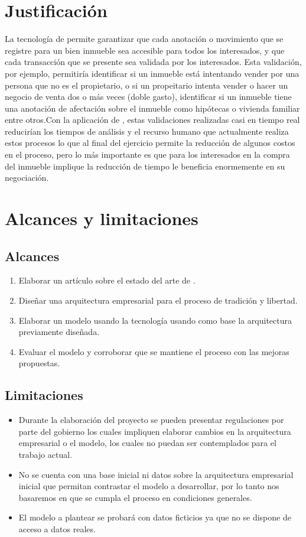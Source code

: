 \section{Justificación}

 La tecnología de \blckchn permite garantizar que cada anotación o movimiento que se registre para un bien inmueble sea accesible para todos los interesados, y que cada transacción que se presente sea validada por los interesados. Esta validación, por ejemplo, permitiría identificar si un inmueble está intentando vender por una persona que no es el propietario, o si un propeitario intenta vender o hacer un negocio de venta dos o más veces (doble gasto), identificar si un inmueble tiene una anotación de afectación sobre el inmueble como hipótecas o vivienda familiar entre otros.Con la aplicación de \blckchn, estas validaciones realizadas casi en tiempo real reducirían los tiempos de análisis y el recurso humano que actualmente realiza estos procesos lo que al final del ejercicio permite la reducción de algunos costos en el proceso, pero lo más importante es que para los interesados en la compra del inmueble implique la reducción de tiempo le beneficia enormemente en su negociación.

\section{Alcances y limitaciones}

\subsection{Alcances}
\begin{enumerate}
\item Elaborar un artículo sobre el estado del arte de \blckchn.
\item Diseñar una arquitectura empresarial para el proceso de tradición y libertad.
\item Elaborar un modelo usando la tecnología \blckchn usando como base la arquitectura previamente diseñada.
\item Evaluar el modelo y corroborar que se mantiene el proceso con las mejoras propuestas.
\end{enumerate}


\subsection{Limitaciones}
\begin{itemize}
\item Durante la elaboración del proyecto se pueden presentar regulaciones por parte del gobierno los cuales impliquen elaborar cambios en la arquitectura empresarial o el modelo, los cuales no puedan ser contemplados para el trabajo actual.
\item No se cuenta con una base inicial ni datos sobre la arquitectura empresarial inicial que permitan contrastar el modelo a desarrollar, por lo tanto nos basaremos en que se cumpla el proceso en condiciones generales.
\item El modelo a plantear se probará con datos ficticios ya que no se dispone de acceso a datos reales.
\end{itemize}


